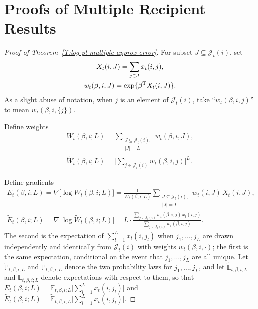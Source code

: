 \documentclass[aoas,preprint]{imsart}
\begin{document}
\section{Proofs of Multiple Recipient Results}\label{S:multiple-recipient-proofs}
 
\begin{proof}[Proof of Theorem~\ref{T:log-pl-multiple-approx-error}]

For subset $J \subseteq \mathcal{J}_t(i)$, set
\begin{gather}
    X_t(i, J) = \sum_{j \in J} x_t(i,j), \\
    w_t(\beta, i, J)
        = \exp\{ \beta^\trans X_t(i,J) \}.
\end{gather}
As a slight abuse of notation, when $j$ is an element of $\mathcal{J}_t(i)$,
take ``$w_t(\beta, i, j)$'' to mean $w_t(\beta, i, \{j\})$.

Define weights
\begin{gather}
    W_t(\beta, i; L)
        = \sum_{\substack{J \subseteq \mathcal{J}_t(i), \\
                          |J| = L}}
              w_t(\beta,i,J), \\
    \widetilde W_t(\beta, i; L)
        =
            \Big[ \sum_{j \in \mathcal{J}_t(i)} w_t(\beta, i, j) \Big]^L.
\end{gather}

Define gradients
\begin{gather}
    E_t(\beta, i; L)
        = \nabla \big[ \log W_t(\beta, i; L) \big]
        =
        \frac{1}{W_t(\beta, i; L)}
        \sum_{\substack{J \subseteq \mathcal{J}_t(i), \\
                        |J| = L}}\!
            w_t(i,J)
            \,
            X_t(i,J), \\
    \widetilde E_t(\beta, i; L)
        = \nabla \big[ \log \widetilde W_t(\beta, i; L) \big]
        =
        L
        \cdot
        \frac{
            \sum_{j \in \mathcal{J}_t(i)}
                w_t(\beta, i, j) \, x_t(i,j)
        }{
            \sum_{j \in \mathcal{J}_t(i)}
                w_t(\beta, i, j)
        }.
\end{gather}
The second is the expectation of $\sum_{l = 1}^L x_t(i, j_l)$ when
$j_1, \ldots, j_L$ are drawn independently and identically from
$\mathcal{J}_t(i)$ with weights $w_t(\beta, i, \cdot)$; the first is the same
expectation, conditional on the event that $j_1, \ldots, j_L$ are all unique.
Let $\tilde{\mathbb{P}}_{t,\beta,i;L}$ and $\mathbb{P}_{t,\beta,i;L}$
denote the two probability laws for $j_1, \ldots, j_L$, and let
$\tilde{\mathbb{E}}_{t,\beta,i;L}$ and $\mathbb{E}_{t,\beta,i;L}$ denote
expectations with respect to them, so that
$E_t(\beta,i;L) = \mathbb{E}_{t,\beta,i;L} \big[ \sum_{l=1}^L x_t(i,j_l)\big]$
and
\(
    \widetilde E_t(\beta,i;L)
    =
    \tilde{\mathbb{E}}_{t,\beta,i;L} \big[ \sum_{l=1}^L x_t(i,j_l)\big].
\)


\end{proof}
\end{document}
